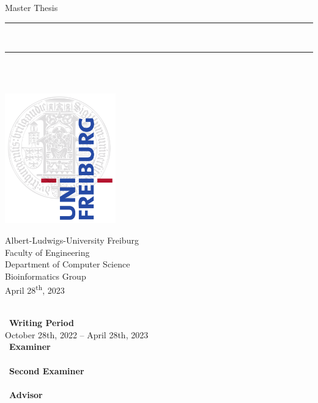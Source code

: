 \begin{titlepage}
\begin{center}

\newcommand{\HorizontalLine}{\rule{\linewidth}{0.3mm}}

{\Large Master Thesis}\\[0.4cm]

\HorizontalLine \\[0.4cm]
{ \huge \bfseries \thetitle }
\HorizontalLine \\[1.7cm]

{\Huge \theauthor} \\[2.2cm]

\vfill

\includegraphics*[width=0.36\textwidth]{media/0_0-uni-logo.png}

\Large {
    Albert-Ludwigs-University Freiburg\\
    Faculty of Engineering\\
    Department of Computer Science\\
    Bioinformatics Group\\
    April 28\textsuperscript{th}, 2023\\
}
\end{center}
\end{titlepage}

\thispagestyle{empty}
\ \vfill \ \\ 
\
\textbf{Writing Period}            \smallskip{} \\
October 28th, 2022 -- April 28th, 2023   \bigskip{} \\
\
\textbf{Examiner}                  \smallskip{} \\
\firstexaminer                     \bigskip{} \\
\
\textbf{Second Examiner}       \smallskip{} \\
\secondexaminer                \bigskip{} \\
\
\textbf{Advisor}                  \smallskip{} \\
\advisers